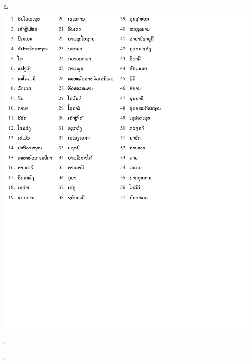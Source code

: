 \L{\includegraphics[trim = 0 320 320 0]{geo57Lao.pdf}}

%
\begin{assgts}
\item \findland.
\item \guessond.
\end{assgts}
%

\makepart{\respsing {\teamcont}}
\pagestyle{somestyle}

